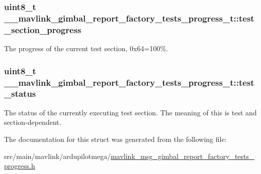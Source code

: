 \hypertarget{struct____mavlink__gimbal__report__factory__tests__progress__t_ac5fb22f9cac1eafad4126744be4b6bf5}{
\subsubsection[{test\+\_\+section\+\_\+progress}]{\setlength{\rightskip}{0pt plus 5cm}uint8\+\_\+t \+\_\+\+\_\+mavlink\+\_\+gimbal\+\_\+report\+\_\+factory\+\_\+tests\+\_\+progress\+\_\+t\+::test\+\_\+section\+\_\+progress}}\label{struct____mavlink__gimbal__report__factory__tests__progress__t_ac5fb22f9cac1eafad4126744be4b6bf5}


The progress of the current test section, 0x64=100\%. 

\hypertarget{struct____mavlink__gimbal__report__factory__tests__progress__t_a8d7590f8ee2d1b7b159aee2a8c928f0d}{
\subsubsection[{test\+\_\+status}]{\setlength{\rightskip}{0pt plus 5cm}uint8\+\_\+t \+\_\+\+\_\+mavlink\+\_\+gimbal\+\_\+report\+\_\+factory\+\_\+tests\+\_\+progress\+\_\+t\+::test\+\_\+status}}\label{struct____mavlink__gimbal__report__factory__tests__progress__t_a8d7590f8ee2d1b7b159aee2a8c928f0d}


The status of the currently executing test section. The meaning of this is test and section-\/dependent. 



The documentation for this struct was generated from the following file\+:\begin{DoxyCompactItemize}
\item 
src/main/mavlink/ardupilotmega/\hyperlink{mavlink__msg__gimbal__report__factory__tests__progress_8h}{mavlink\+\_\+msg\+\_\+gimbal\+\_\+report\+\_\+factory\+\_\+tests\+\_\+progress.\+h}\end{DoxyCompactItemize}
